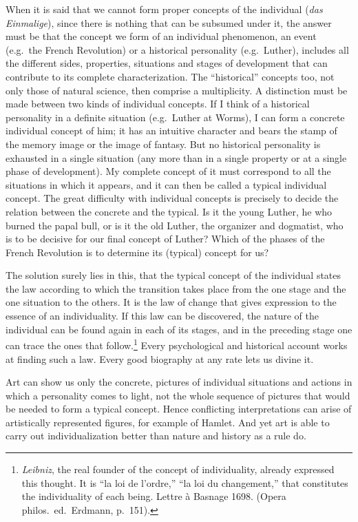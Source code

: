 \documentclass[12pt]{article}
\newcommand{\opage}[1]{\marginnote{\footnotesize\textit{[#1]}}}
\begin{document}
When it is said that we cannot form proper concepts of the individual
(\textit{das Einmalige}), since there is nothing that can be subsumed under it,
the answer must be that the concept we form of an individual phenomenon, an
event (e.g.\ the French Revolution) or a historical personality (e.g.\ Luther),
includes all the different sides, properties, situations and stages of
development that can contribute to its complete characterization. The
``historical'' concepts too, not only those of natural science,
\opage{24}%
then comprise a multiplicity. A distinction must be made between two kinds of
individual concepts. If I think of a historical personality in a definite
situation (e.g.\ Luther at Worms), I can form a concrete individual concept of
him; it has an intuitive character and bears the stamp of the memory image or
the image of fantasy. But no historical personality is exhausted in a single
situation (any more than in a single property or at a single phase of
development). My complete concept of it must correspond to all the situations in
which it appears, and it can then be called a typical individual concept. The
great difficulty with individual concepts is precisely to decide the relation
between the concrete and the typical. Is it the young Luther, he who burned the
papal bull, or is it the old Luther, the organizer and dogmatist, who is to be
decisive for our final concept of Luther? Which of the phases of the French
Revolution is to determine its (typical) concept for us?

The solution surely lies in this, that the typical concept of the individual
states the law according to which the transition takes place
\opage{25}%
from the one stage and the one situation to the others. It is the law of change
that gives expression to the essence of an individuality. If this law can be
discovered, the nature of the individual can be found again in each of its
stages, and in the preceding stage one can trace the ones that
follow.\footnote{\textit{Leibniz}, the real founder of the concept of
individuality, already expressed this thought. It is ``la loi de l'ordre,''
``la loi du changement,'' that constitutes the individuality of each being.
Lettre à Basnage 1698. (Opera philos.\ ed.\ Erdmann, p.~151).} Every
psychological and historical account works at finding such a law. Every good
biography at any rate lets us divine it.

Art can show us only the concrete, pictures of individual situations and
actions in which a personality comes to light, not the whole sequence of
pictures that would be needed to form a typical concept. Hence conflicting
interpretations can arise of artistically represented figures, for example of
Hamlet. And yet art is able to carry out individualization better than nature
and history as a rule do.
\end{document}
